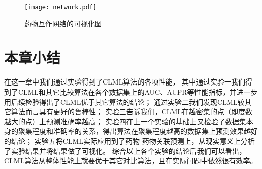\begin{figure}
    \centering
    \texttt{[image: network.pdf]}
    \caption{药物互作网络的可视化图}
    \label{experiments:fig:network}    
\end{figure}


\section{本章小结}
在这一章中我们通过实验得到了CLML算法的各项性能，
其中通过实验一我们得到了CLML和其它比较算法在各个数据集上的AUC、AUPR等性能指标，并进一步用后续检验得出了CLML优于其它算法的结论；
通过实验二我们发现CLML较其它算法而言具有更好的鲁棒性；
实验三告诉我们，CLML在越密集的点（即度数越大的点）上预测准确率越高；
实验四在上一个实验的基础上又检验了数据集本身的聚集程度和准确率的关系，得出算法在聚集程度越高的数据集上预测效果越好的结论；
实验五将CLML实际应用到了药物-药物关联预测上，从现实意义上分析了实验结果并将结果做了可视化。
综合以上各个实验的结论后我们可以看出，CLML算法从整体性能上就要优于其它对比算法，且在实际问题中依然很有效率。
